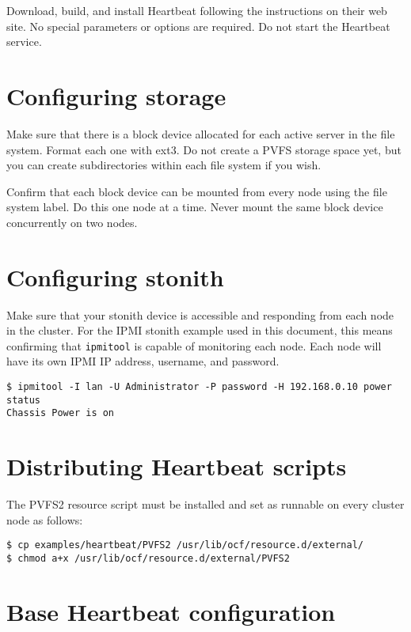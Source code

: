 \documentclass[11pt]{article}
\begin{document}
Download, build, and install Heartbeat following the instructions on
their web site.  No special parameters or options are required.  Do not
start the Heartbeat service.

\section{Configuring storage}

Make sure that there is a block device allocated for each active server
in the file system.  Format each one with ext3.  Do not create a PVFS
storage space yet, but you can create subdirectories within each file
system if you wish.

Confirm that each block device can be mounted from every node using the
file system label.  Do this one node at a time.  Never mount
the same block device concurrently on two nodes.

\section{Configuring stonith}

Make sure that your stonith device is accessible and responding from each
node in the cluster.  For the IPMI stonith example used in this document,
this means confirming that \texttt{ipmitool} is capable of monitoring
each node.  Each node will have its own IPMI IP address, username, and
password.

\begin{verbatim}
$ ipmitool -I lan -U Administrator -P password -H 192.168.0.10 power status
Chassis Power is on
\end{verbatim}

\section{Distributing Heartbeat scripts}

The PVFS2 resource script must be installed and set as runnable on every
cluster node as follows:

\begin{verbatim}
$ cp examples/heartbeat/PVFS2 /usr/lib/ocf/resource.d/external/
$ chmod a+x /usr/lib/ocf/resource.d/external/PVFS2
\end{verbatim}

\section{Base Heartbeat configuration}
\end{document}
